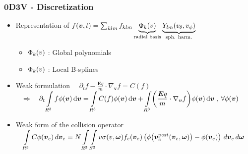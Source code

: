 \documentclass[mathserif, aspectratio=169]{beamer}
\newcommand{\ud}{\,\mathrm{d}}
\newcommand{\vect}[1]{\boldsymbol{#1}}
\newcommand{\of}[1]{\mleft( #1 \mright)}
\newcommand{\myint}{\int\limits}
\newcommand{\diff}[1]{\, d#1}
\begin{document}
\begin{frame}
	\frametitle{0D3V - Discretization}
	\small
	\begin{itemize}
		\item Representation of $f\of{\vect{v},t} = \sum_{klm} f_{klm} \underbrace{\Phi_k\of{v}}_{\text{radial basis}} \underbrace{Y_{lm}\of{v_\theta, v_\phi}}_{\tiny\text{sph. harm.}}$
		\begin{itemize}
			\item $\Phi_k\of{v}$ : Global polynomials
			\item $\Phi_k\of{v}$ : Local B-splines
		\end{itemize}
		\item Weak formulation
			$
			\displaystyle
			\quad
			\partial_t f - \frac{\vect{E} q}{m} \cdot \nabla_{\vect{v}}f = C(f)
			\quad $ \\
			$
			\displaystyle
			\quad
			\Rightarrow \quad
			\partial_t \myint_{R^3} f \phi\of{\vect{v}} \ud \vect{v} = 
			\myint_{R^3} C(f) \phi\of{\vect{v}} \ud \vect{v} + \myint_{R^3} \of{\frac{\vect{E} q}{m} \cdot \nabla_{\vect{v}} f} \phi(\vect{v}) \ud \vect{v}\text{ , } 
			\forall \phi(\vect{v})$
		\item Weak form of the collision operator \\
			$
			\displaystyle
			\quad 
			\myint_{R^3} C \phi\of{\vect{v}_e} \diff{\vect{v}_e} 
			=
			N \myint_{R^3} \myint_{S^2} 
			v\sigma(v,\vect{\omega})
			f_e\of{\vect{v}_e}
			\left(
			\phi\of{\vect{v}_e^\text{post}\of{\vect{v}_e, \vect{\omega}}} 
			- \phi\of{\vect{v}_e} 
			\right)
			\diff{\vect{v}_e} \diff{\vect{\omega}}
			$
	\end{itemize}
\end{frame}
\end{document}
